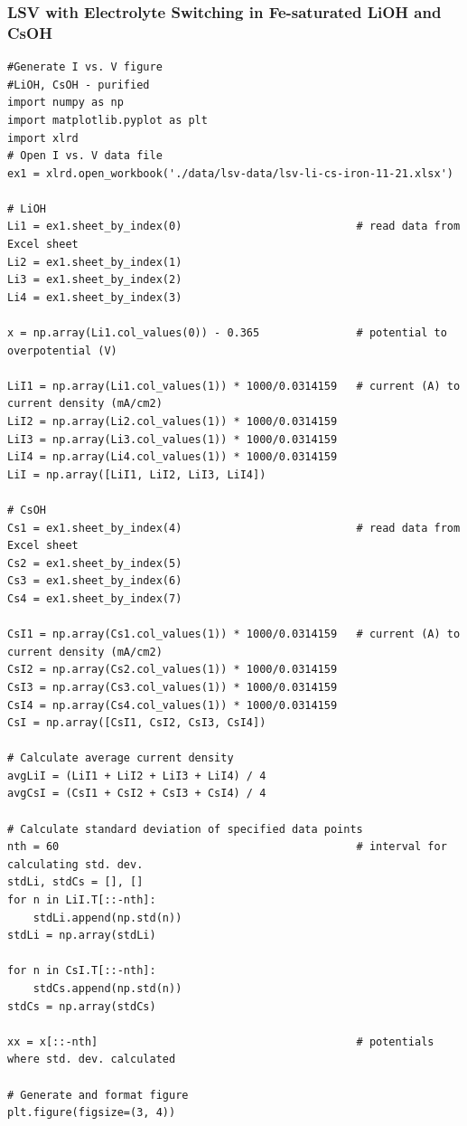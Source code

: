 \documentclass[journal=jpccck,manuscript=suppinfo,email=true]{achemso}
\begin{document}
\subsubsection{LSV with Electrolyte Switching in Fe-saturated LiOH and CsOH}
\label{sec-6-1-2}
\begin{verbatim}
#Generate I vs. V figure
#LiOH, CsOH - purified
import numpy as np
import matplotlib.pyplot as plt
import xlrd
# Open I vs. V data file
ex1 = xlrd.open_workbook('./data/lsv-data/lsv-li-cs-iron-11-21.xlsx')

# LiOH
Li1 = ex1.sheet_by_index(0)                           # read data from Excel sheet
Li2 = ex1.sheet_by_index(1)
Li3 = ex1.sheet_by_index(2)
Li4 = ex1.sheet_by_index(3)

x = np.array(Li1.col_values(0)) - 0.365               # potential to overpotential (V)

LiI1 = np.array(Li1.col_values(1)) * 1000/0.0314159   # current (A) to current density (mA/cm2)
LiI2 = np.array(Li2.col_values(1)) * 1000/0.0314159
LiI3 = np.array(Li3.col_values(1)) * 1000/0.0314159
LiI4 = np.array(Li4.col_values(1)) * 1000/0.0314159
LiI = np.array([LiI1, LiI2, LiI3, LiI4])

# CsOH
Cs1 = ex1.sheet_by_index(4)                           # read data from Excel sheet
Cs2 = ex1.sheet_by_index(5)
Cs3 = ex1.sheet_by_index(6)
Cs4 = ex1.sheet_by_index(7)

CsI1 = np.array(Cs1.col_values(1)) * 1000/0.0314159   # current (A) to current density (mA/cm2)
CsI2 = np.array(Cs2.col_values(1)) * 1000/0.0314159
CsI3 = np.array(Cs3.col_values(1)) * 1000/0.0314159
CsI4 = np.array(Cs4.col_values(1)) * 1000/0.0314159
CsI = np.array([CsI1, CsI2, CsI3, CsI4])

# Calculate average current density
avgLiI = (LiI1 + LiI2 + LiI3 + LiI4) / 4
avgCsI = (CsI1 + CsI2 + CsI3 + CsI4) / 4

# Calculate standard deviation of specified data points
nth = 60                                              # interval for calculating std. dev.
stdLi, stdCs = [], []
for n in LiI.T[::-nth]:
    stdLi.append(np.std(n))
stdLi = np.array(stdLi)

for n in CsI.T[::-nth]:
    stdCs.append(np.std(n))
stdCs = np.array(stdCs)

xx = x[::-nth]                                        # potentials where std. dev. calculated

# Generate and format figure
plt.figure(figsize=(3, 4))


\end{verbatim}
\end{document}
